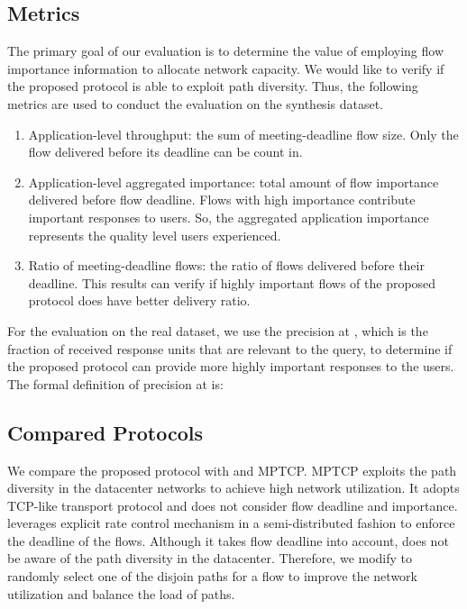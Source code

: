 \documentclass[conference]{IEEEtran}
\begin{document}
\subsection{Metrics}

The primary goal of our evaluation is to determine the value of employing flow importance information to allocate network capacity. We would like to verify if the proposed protocol is able to exploit path diversity. Thus, the following metrics are used to conduct the evaluation on the synthesis dataset.

\begin{enumerate}
\item Application-level throughput: the sum of meeting-deadline flow size. Only the flow delivered before its deadline can be count in.
\item Application-level aggregated importance: total amount of flow importance delivered before flow deadline. Flows with high importance contribute important responses to users. So, the aggregated application importance represents the quality level users experienced.
\item Ratio of meeting-deadline flows: the ratio of flows delivered before their deadline. This results can verify if highly important flows of the proposed protocol does have better delivery ratio.
\end{enumerate}

For the evaluation on the real dataset, we use the precision at , which is the fraction of received response units that are relevant to the query, to determine if the proposed protocol can provide more highly important responses to the users. The formal definition of precision at  is:



\subsection{Compared Protocols}

We compare the proposed protocol with \cite{deadline} and MPTCP\cite{mptcp}. MPTCP exploits the path diversity in the datacenter networks to achieve high network utilization. It adopts TCP-like transport protocol and does not consider flow deadline and importance.  leverages explicit rate control mechanism in a semi-distributed fashion to enforce the deadline of the flows. Although it takes flow deadline into account,  does not be aware of the path diversity in the datacenter. Therefore, we modify  to randomly select one of the disjoin paths for a flow to improve the network utilization and balance the load of paths.
\end{document}
